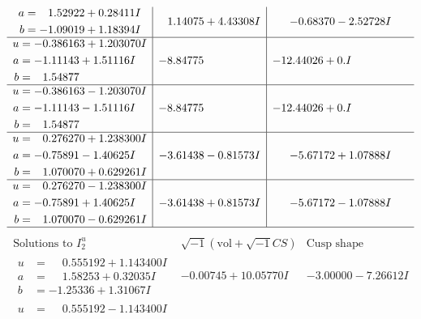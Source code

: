 \documentclass[1p]{elsarticle_modified}
\theoremstyle{definition}
\newcommand{\I}{\sqrt{-1}}
\begin{document}
$$\begin{array}{c|c|c}
\begin{aligned}
a &= \phantom{-}1.52922 + 0.28411 I \\
b &= -1.09019 + 1.18394 I\end{aligned}
 & \phantom{-}1.14075 + 4.43308 I & -0.68370 - 2.52728 I \\ \hline\begin{aligned}
u &= -0.386163 + 1.203070 I \\
a &= -1.11143 + 1.51116 I \\
b &= \phantom{-}1.54877\phantom{ +0.000000I}\end{aligned}
 & -8.84775\phantom{ +0.000000I} & -12.44026 + 0. I\phantom{ +0.000000I} \\ \hline\begin{aligned}
u &= -0.386163 - 1.203070 I \\
a &= -1.11143 - 1.51116 I \\
b &= \phantom{-}1.54877\phantom{ +0.000000I}\end{aligned}
 & -8.84775\phantom{ +0.000000I} & -12.44026 + 0. I\phantom{ +0.000000I} \\ \hline\begin{aligned}
u &= \phantom{-}0.276270 + 1.238300 I \\
a &= -0.75891 - 1.40625 I \\
b &= \phantom{-}1.070070 + 0.629261 I\end{aligned}
 & -3.61438 - 0.81573 I & -5.67172 + 1.07888 I \\ \hline\begin{aligned}
u &= \phantom{-}0.276270 - 1.238300 I \\
a &= -0.75891 + 1.40625 I \\
b &= \phantom{-}1.070070 - 0.629261 I\end{aligned}
 & -3.61438 + 0.81573 I & -5.67172 - 1.07888 I\\
 \hline 
 \end{array}$$\newpage$$\begin{array}{c|c|c}  
\text{Solutions to }I^u_{2}& \I (\text{vol} + \sqrt{-1}CS) & \text{Cusp shape}\\
 \hline 
\begin{aligned}
u &= \phantom{-}0.555192 + 1.143400 I \\
a &= \phantom{-}1.58253 + 0.32035 I \\
b &= -1.25336 + 1.31067 I\end{aligned}
 & -0.00745 + 10.05770 I & -3.00000 - 7.26612 I \\ \hline\begin{aligned}
u &= \phantom{-}0.555192 - 1.143400 I \\

\end{aligned}
\end{array}$$
\end{document}
